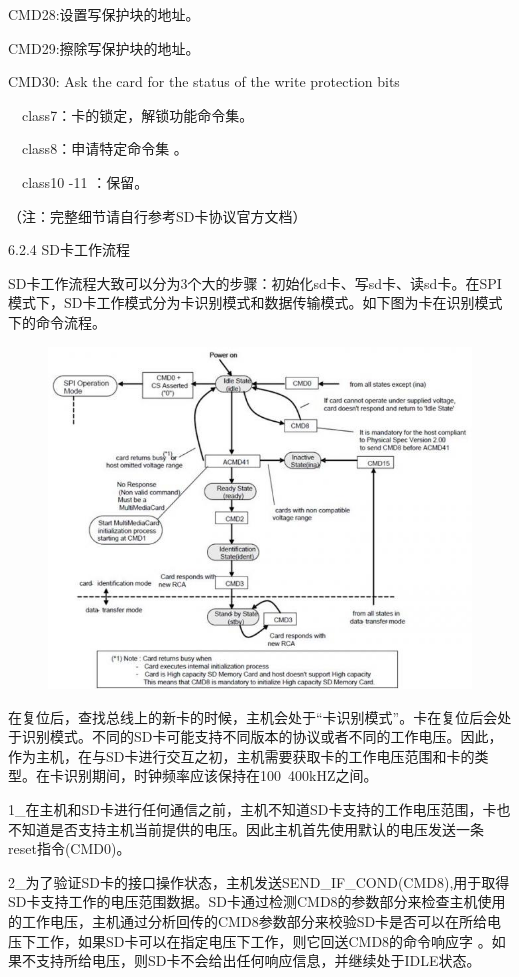 CMD28:设置写保护块的地址。

CMD29:擦除写保护块的地址。

CMD30: Ask the card for the status of the write protection bits

　class7：卡的锁定，解锁功能命令集。

　class8：申请特定命令集 。

　class10 -11 ：保留。

（注：完整细节请自行参考SD卡协议官方文档）

6.2.4 SD卡工作流程

SD卡工作流程大致可以分为3个大的步骤：初始化sd卡、写sd卡、读sd卡。在SPI模式下，SD卡工作模式分为卡识别模式和数据传输模式。如下图为卡在识别模式下的命令流程。

\begin{figure}[H]
    \centering
    \includegraphics{figures/06-02-命令流程.png}
\end{figure}

在复位后，查找总线上的新卡的时候，主机会处于“卡识别模式”。卡在复位后会处于识别模式。不同的SD卡可能支持不同版本的协议或者不同的⼯作电压。因此，作为主机，在与SD卡进行交互之初，主机需要获取卡的工作电压范围和卡的类型。在卡识别期间，时钟频率应该保持在100~400kHZ之间。

1_在主机和SD卡进行任何通信之前，主机不知道SD卡支持的工作电压范围，卡也不知道是否支持主机当前提供的电压。因此主机首先使用默认的电压发送一条reset指令(CMD0)。

2_为了验证SD卡的接口操作状态，主机发送SEND_IF_COND(CMD8),用于取得SD卡支持工作的电压范围数据。SD卡通过检测CMD8的参数部分来检查主机使用的工作电压，主机通过分析回传的CMD8参数部分来校验SD卡是否可以在所给电压下工作，如果SD卡可以在指定电压下工作，则它回送CMD8的命令响应字 。如果不支持所给电压，则SD卡不会给出任何响应信息，并继续处于IDLE状态。

